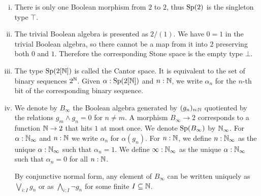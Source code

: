 \begin{example}
  \label{boolean-algebra-examples}
  \item 
  \begin{enumerate}[(i)]
  \item There is only one Boolean morphism from $2$ to $2$, thus $\operatorname{Sp}(2)$ is the singleton type $\top$. 
  \item   
    The trivial Boolean algebra is presented as $2/(1)$. 
    We have $0=1$ in the trivial Boolean algebra, so  
    there cannot be a map from it into $2$ preserving both $0$ and $1$.
    Therefore the corresponding Stone space is the empty type $\bot$.
  \item\label{ExampleBAunderCantor}   
    The type $\operatorname{Sp}(2[\mathbb{N}])$ is called the Cantor space. It is equivalent to the set of binary sequences $2^{\mathbb{N}}$. 
    Given $\alpha:\operatorname{Sp}(2[\mathbb{N}])$ and $n:\mathbb{N}$, we write $\alpha_n$ for the $n$-th bit of the corresponding binary sequence. 
  \item\label{ExampleBAunderNinfty}
    We denote by $B_\infty$ the Boolean algebra generated by 
    $(g_n)_{n:\mathbb{N}}$ quotiented by the relations $g_m \wedge g_n = 0$ for ${n\neq m}$.
    A morphism $B_\infty\to 2$ corresponds to a function 
    $\mathbb{N} \to 2$ that hits $1$ at most once. 
    We denote $\operatorname{Sp}(B_\infty)$ by $\mathbb{N}_{\infty}$. 
    For $\alpha:\mathbb{N}_{\infty}$ and $n:\mathbb{N}$ we write $\alpha_n$ for $\alpha(g_n)$. For $n:\mathbb{N}$, we define $n:\mathbb{N}_{\infty}$ as the unique $\alpha:\mathbb{N}_{\infty}$ such that $\alpha_n=1$. We define $\infty:\mathbb{N}_{\infty}$ as the unique $\alpha:\mathbb{N}_\infty$ such that $\alpha_n=0$ for all $n:\mathbb{N}$.
  
  By conjunctive normal form, 
  any element of $B_\infty$ can be written uniquely as 
  $\bigvee_{i:I} g_n$ or as $\bigwedge_{i:I} \neg g_n$ for some finite $I\subseteq \mathbb{N}$. 
  \end{enumerate}
\end{example}

